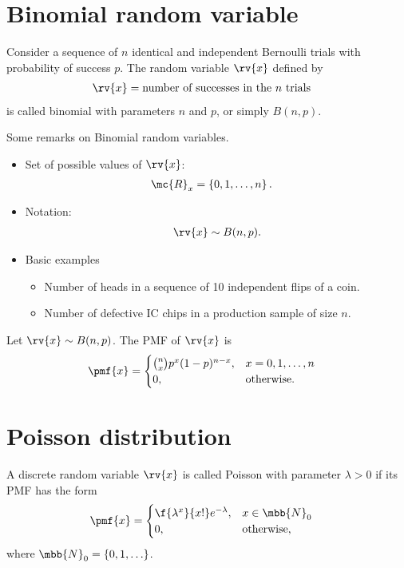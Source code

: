 \section{Binomial random variable}
\begin{mydefinition}
    Consider a sequence of $n$ identical and independent Bernoulli trials with probability of success $p$. The random variable $\rv{x}$ defined by
    \begin{align}
        \rv{x} &= \text{number of successes in the $n$ trials}
    \end{align}
    is called binomial with parameters $n$ and $p$, or simply $B(n,p)$.
\end{mydefinition}
\begin{myremark}
    Some remarks on Binomial random variables.
    \begin{itemize}
        \item Set of possible values of $\rv{x}$:
        \begin{align}
            \mc{R}_{x} &= \left\{ 0, 1, \ldots, n\right\}.
        \end{align}
        \item Notation:
        \begin{align}
            \rv{x} \sim B(n, p).
        \end{align}
        \item Basic examples
        \begin{itemize}
            \item Number of heads in a sequence of 10 independent flips of a coin.
            \item Number of defective IC chips in a production sample of size $n$.
        \end{itemize}
    \end{itemize}
\end{myremark}
\begin{mytheorem}
   Let $\rv{x}\sim B(n,p)$. The PMF of $\rv{x}$ is
   \begin{align}
       \pmf{x} &= 
       \begin{cases}
           {n \choose x} p^{x}(1-p)^{n-x}, &x = 0, 1, \ldots, n\\
           0, &\text{otherwise}.
       \end{cases}
   \end{align}
\end{mytheorem}


\section{Poisson distribution}
A discrete random variable $\rv{x}$ is called Poisson with parameter $\lambda > 0$ if its PMF has the form
\begin{align}
    \pmf{x} &= 
    \begin{cases}
        \f{\lambda^{x}}{x!}e^{-\lambda}, &x\in\mbb{N}_{0}\\
        0, &\text{otherwise},
    \end{cases}
\end{align}
where $\mbb{N}_{0} = \left\{ 0, 1, \ldots\right\}$.

